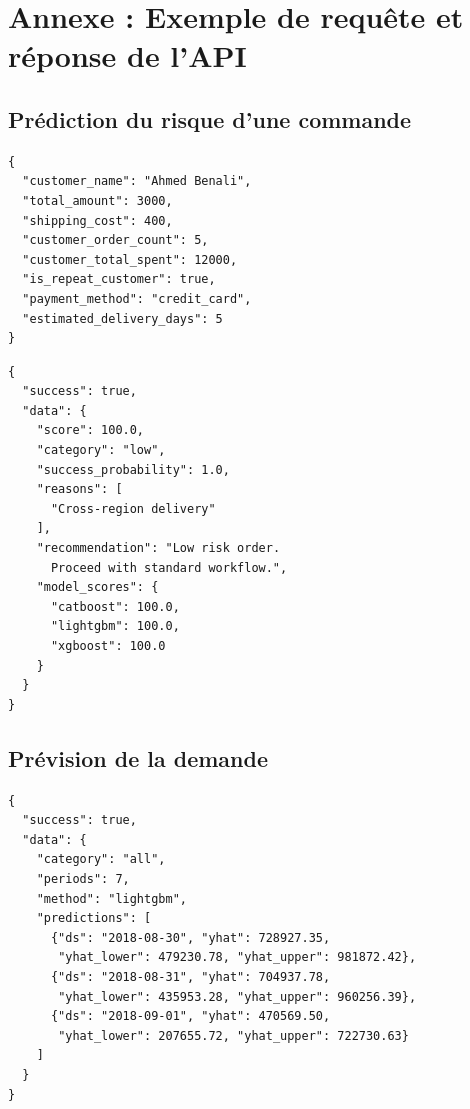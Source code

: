 \documentclass[12pt,a4paper]{report}
\begin{document}
\appendix
\chapter{Annexe : Exemple de requ\^{e}te et r\'{e}ponse de l'API}

\section{Pr\'{e}diction du risque d'une commande}

\begin{lstlisting}[language={}, caption={Requ\^{e}te POST /api/predict/order-risk}]
{
  "customer_name": "Ahmed Benali",
  "total_amount": 3000,
  "shipping_cost": 400,
  "customer_order_count": 5,
  "customer_total_spent": 12000,
  "is_repeat_customer": true,
  "payment_method": "credit_card",
  "estimated_delivery_days": 5
}
\end{lstlisting}

\begin{lstlisting}[language={}, caption={R\'{e}ponse de l'API de pr\'{e}diction}]
{
  "success": true,
  "data": {
    "score": 100.0,
    "category": "low",
    "success_probability": 1.0,
    "reasons": [
      "Cross-region delivery"
    ],
    "recommendation": "Low risk order.
      Proceed with standard workflow.",
    "model_scores": {
      "catboost": 100.0,
      "lightgbm": 100.0,
      "xgboost": 100.0
    }
  }
}
\end{lstlisting}

\section{Pr\'{e}vision de la demande}

\begin{lstlisting}[language={}, caption={R\'{e}ponse GET /api/forecast/demand?category=all\&periods=7}]
{
  "success": true,
  "data": {
    "category": "all",
    "periods": 7,
    "method": "lightgbm",
    "predictions": [
      {"ds": "2018-08-30", "yhat": 728927.35,
       "yhat_lower": 479230.78, "yhat_upper": 981872.42},
      {"ds": "2018-08-31", "yhat": 704937.78,
       "yhat_lower": 435953.28, "yhat_upper": 960256.39},
      {"ds": "2018-09-01", "yhat": 470569.50,
       "yhat_lower": 207655.72, "yhat_upper": 722730.63}
    ]
  }
}
\end{lstlisting}
\end{document}
